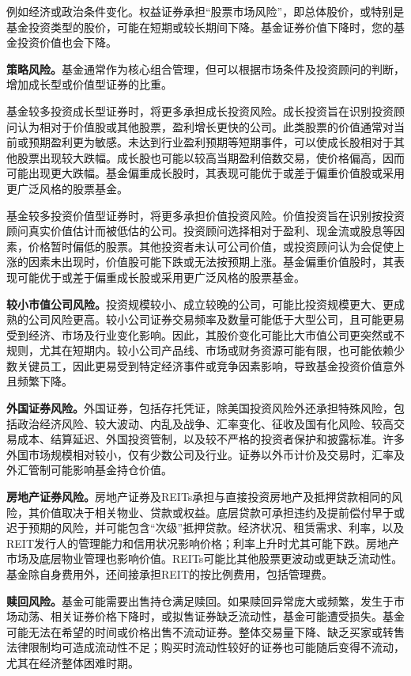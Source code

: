 \documentclass[UTF8,fontset=none,11pt,a4paper]{ctexart}
\begin{document}
例如经济或政治条件变化。权益证券承担“股票市场风险”，即总体股价，或特别是基金投资类型的股价，可能在短期或较长期间下降。基金证券价值下降时，您的基金投资价值也会下降。

\textbf{策略风险。}基金通常作为核心组合管理，但可以根据市场条件及投资顾问的判断，增加成长型或价值型证券的比重。

基金较多投资成长型证券时，将更多承担成长投资风险。成长投资旨在识别投资顾问认为相对于价值股或其他股票，盈利增长更快的公司。此类股票的价值通常对当前或预期盈利更为敏感。未达到行业盈利预期等短期事件，可以使成长股相对于其他股票出现较大跌幅。成长股也可能以较高当期盈利倍数交易，使价格偏高，因而可能出现更大跌幅。基金偏重成长股时，其表现可能优于或差于偏重价值股或采用更广泛风格的股票基金。

基金较多投资价值型证券时，将更多承担价值投资风险。价值投资旨在识别按投资顾问真实价值估计而被低估的公司。投资顾问选择相对于盈利、现金流或股息等因素，价格暂时偏低的股票。其他投资者未认可公司价值，或投资顾问认为会促使上涨的因素未出现时，价值股可能下跌或无法按预期上涨。基金偏重价值股时，其表现可能优于或差于偏重成长股或采用更广泛风格的股票基金。

\textbf{较小市值公司风险。}投资规模较小、成立较晚的公司，可能比投资规模更大、更成熟的公司风险更高。较小公司证券交易频率及数量可能低于大型公司，且可能更易受到经济、市场及行业变化影响。因此，其股价变化可能比大市值公司更突然或不规则，尤其在短期内。较小公司产品线、市场或财务资源可能有限，也可能依赖少数关键员工，因此更易受到特定经济事件或竞争因素影响，导致基金投资价值意外且频繁下降。


\par{}\label{originalpage5}
\textbf{外国证券风险。}外国证券，包括存托凭证，除美国投资风险外还承担特殊风险，包括政治经济风险、较大波动、内乱及战争、汇率变化、征收及国有化风险、较高交易成本、结算延迟、外国投资管制，以及较不严格的投资者保护和披露标准。许多外国市场规模相对较小，仅有少数公司及行业。证券以外币计价及交易时，汇率及外汇管制可能影响基金持仓价值。

\textbf{房地产证券风险。}房地产证券及REITs承担与直接投资房地产及抵押贷款相同的风险，其价值取决于相关物业、贷款或权益。底层贷款可承担违约及提前偿付早于或迟于预期的风险，并可能包含“次级”抵押贷款。经济状况、租赁需求、利率，以及REIT发行人的管理能力和信用状况影响价格；利率上升时尤其可能下跌。房地产市场及底层物业管理也影响价值。REITs可能比其他股票更波动或更缺乏流动性。基金除自身费用外，还间接承担REIT的按比例费用，包括管理费。

\textbf{赎回风险。}基金可能需要出售持仓满足赎回。如果赎回异常庞大或频繁，发生于市场动荡、相关证券价格下降时，或拟售证券缺乏流动性，基金可能遭受损失。基金可能无法在希望的时间或价格出售不流动证券。整体交易量下降、缺乏买家或转售法律限制均可造成流动性不足；购买时流动性较好的证券也可能随后变得不流动，尤其在经济整体困难时期。
\end{document}
